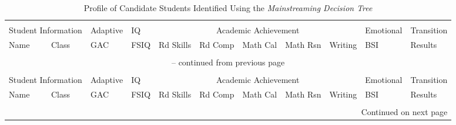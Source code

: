 \documentclass[twoside]{article}
\begin{document}
%
%
\begin{tiny}
	\begin{landscape}
		\setlength\LTleft{-1.5in}
		\setlength{}
	\begin{longtable}{p{1.5cm}p{1.5cm}p{1.5cm}p{1.5cm}p{1.75cm}p{1.75cm}p{1.75cm}p{1.75cm}p{1.75cm}p{1.75cm}p{2.5cm}@{}}
			\captionsetup{font=tiny}
			\caption{Profile of Candidate Students Identified Using the \textit{Mainstreaming Decision Tree}\label{tab5}}
			\\
			\multicolumn{2}{c}{Student Information} & Adaptive & IQ & \multicolumn{5}{c}{Academic Achievement} & Emotional & Transition\\
			\cmidrule(lr){1-2}
			\cmidrule(lr){5-9}
			Name & Class & GAC & FSIQ & Rd Skills & Rd Comp & Math Cal & Math Rsn & Writing & BSI & Results\\
			\hline\\
			\endfirsthead
			\multicolumn{11}{c}{-- continued from previous page} \\ \\
			\multicolumn{2}{c}{Student Information} & Adaptive & IQ & \multicolumn{5}{c}{Academic Achievement} & Emotional & Transition\\
			\cmidrule(lr){1-2}
			\cmidrule(lr){5-9}
			Name & Class & GAC & FSIQ & Rd Skills & Rd Comp & Math Cal & Math Rsn & Writing & BSI & Results\\
			\hline\\
			\endhead
			\hline \multicolumn{11}{r}{{Continued on next page}} \\ \hline

\end{longtable}
\end{landscape}
\end{tiny}
\end{document}
